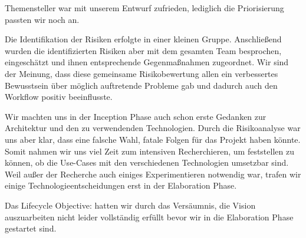 \documentclass[10pt]{article}
\begin{document}
Themensteller war mit unserem Entwurf zufrieden, lediglich die Priorisierung passten wir noch an.\par
\medskip
Die Identifikation der Risiken erfolgte in einer kleinen Gruppe. Anschließend wurden die identifizierten Risiken aber
mit dem gesamten Team besprochen, eingeschätzt und ihnen entsprechende Gegenmaßnahmen zugeordnet.
Wir sind der Meinung, dass diese gemeinsame Risikobewertung allen
ein verbessertes Bewusstsein über möglich auftretende Probleme gab und dadurch auch den Workflow positiv beeinflusste.\par
\medskip
Wir machten uns in der Inception Phase auch schon erste Gedanken zur Architektur und den zu verwendenden Technologien.
Durch die Risikoanalyse war uns aber klar, dass eine falsche Wahl, fatale Folgen für das Projekt haben könnte.
Somit nahmen wir uns viel Zeit zum intensiven Recherchieren, um feststellen zu können, ob die Use-Cases mit den
verschiedenen Technologien umsetzbar sind. Weil außer der Recherche auch einiges Experimentieren notwendig war,
trafen wir einige Technologieentscheidungen erst in der Elaboration Phase.\par
\medskip
Das Lifecycle Objective:  hatten wir durch das Versäumnis, die Vision
auszuarbeiten nicht leider vollständig erfüllt bevor wir in die Elaboration Phase gestartet sind.

\newpage
\end{document}
